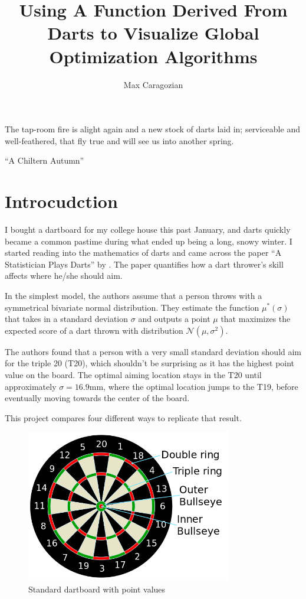 \documentclass[]{article}
\title{Using A Function Derived From Darts to Visualize Global Optimization Algorithms}
\author{Max Caragozian}
\begin{document}
\maketitle


\epigraph{The tap-room fire is alight again and a new stock of darts laid in; serviceable and well-feathered, that fly true and will see us into another spring.}{``A Chiltern Autumn'' \cite{1929spectator}}

\section{Introcudction}
I bought a dartboard for my college house this past January, and darts quickly became a common pastime during what ended up being a long, snowy winter. I started reading into the mathematics of darts and came across the paper ``A Statistician Plays Darts'' by \citeauthor{stat}\cite{stat}. The paper quantifies how a dart thrower's skill affects where he/she should aim. 

In the simplest model, the authors assume that a person throws with a symmetrical bivariate normal distribution. They estimate the function $\mu^*(\sigma)$ that takes in a standard deviation $\sigma$ and outputs a point $\mu$ that maximizes the expected score of a dart thrown with distribution $\mathcal{N}(\mu, \sigma^2)$.

The authors found that a person with a very small standard deviation should aim for the triple 20 (T20), which shouldn't be surprising as it has the highest point value on the board. The optimal aiming location stays in the T20 until approximately $\sigma=16.9$mm, where the optimal location jumps to the T19, before eventually moving towards the center of the board.

This project compares four different ways to replicate that result.

\begin{figure}
	\centering
	\includegraphics[width=0.8\textwidth]{../images/dartboard_diagram.png}
	\caption{Standard dartboard with point values \cite{diag}}
	\label{fig:diag}
\end{figure}
\end{document}
